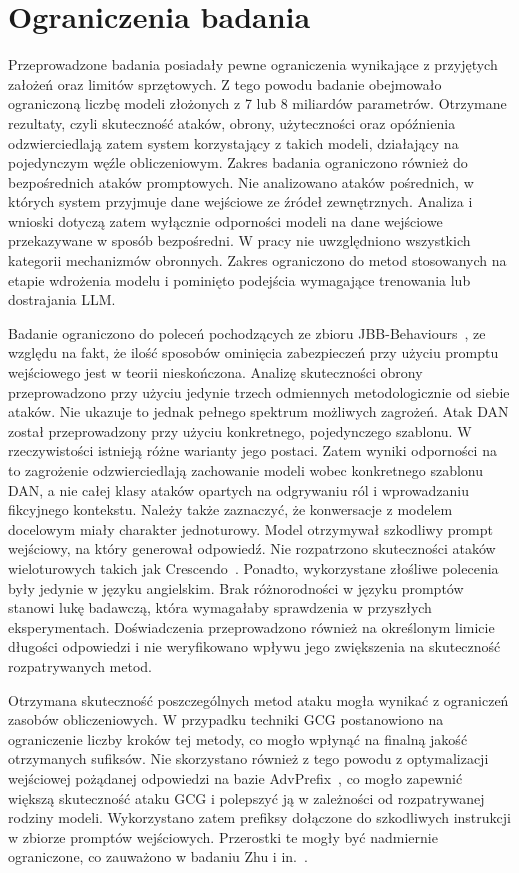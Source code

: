 \section{Ograniczenia badania}
Przeprowadzone badania posiadały pewne ograniczenia wynikające z przyjętych założeń oraz limitów sprzętowych. Z tego powodu badanie obejmowało ograniczoną liczbę modeli złożonych z 7 lub 8 miliardów parametrów. Otrzymane rezultaty, czyli skuteczność ataków, obrony, użyteczności oraz opóźnienia odzwierciedlają zatem system korzystający z takich modeli, działający na pojedynczym węźle obliczeniowym. Zakres badania ograniczono również do bezpośrednich ataków promptowych. Nie analizowano ataków pośrednich, w których system przyjmuje dane wejściowe ze źródeł zewnętrznych. Analiza i wnioski dotyczą zatem wyłącznie odporności modeli na dane wejściowe przekazywane w sposób bezpośredni. W pracy nie uwzględniono wszystkich kategorii mechanizmów obronnych. Zakres ograniczono do metod stosowanych na etapie wdrożenia modelu i pominięto podejścia wymagające trenowania lub dostrajania \gls{LLM}.

Badanie ograniczono do poleceń pochodzących ze zbioru JBB-Behaviours~\cite{chao2024jailbreakbenchopenrobustnessbenchmark}, ze względu na fakt, że ilość sposobów ominięcia zabezpieczeń przy użyciu promptu wejściowego jest w teorii nieskończona. Analizę skuteczności obrony przeprowadzono przy użyciu jedynie trzech odmiennych metodologicznie od siebie ataków. Nie ukazuje to jednak pełnego spektrum możliwych zagrożeń. Atak \gls{DAN} został przeprowadzony przy użyciu konkretnego, pojedynczego szablonu. W rzeczywistości istnieją różne warianty jego postaci. Zatem wyniki odporności na to zagrożenie odzwierciedlają zachowanie modeli wobec konkretnego szablonu \gls{DAN}, a nie całej klasy ataków opartych na odgrywaniu ról i wprowadzaniu fikcyjnego kontekstu. Należy także zaznaczyć, że konwersacje z modelem docelowym miały charakter jednoturowy. Model otrzymywał szkodliwy prompt wejściowy, na który generował odpowiedź. Nie rozpatrzono skuteczności ataków wieloturowych takich jak Crescendo~\cite{russinovich2025greatwritearticlethat}. Ponadto, wykorzystane złośliwe polecenia były jedynie w języku angielskim. Brak różnorodności w języku promptów stanowi lukę badawczą, która wymagałaby sprawdzenia w przyszłych eksperymentach. Doświadczenia przeprowadzono również na określonym limicie długości odpowiedzi i nie weryfikowano wpływu jego zwiększenia na skuteczność rozpatrywanych metod.

Otrzymana skuteczność poszczególnych metod ataku mogła wynikać z ograniczeń zasobów obliczeniowych. W przypadku techniki \gls{GCG} postanowiono na ograniczenie liczby kroków tej metody, co mogło wpłynąć na finalną jakość otrzymanych sufiksów. Nie skorzystano również z tego powodu z optymalizacji wejściowej pożądanej odpowiedzi na bazie AdvPrefix~\cite{zhu2025advprefixobjectivenuancedllm}, co mogło zapewnić większą skuteczność ataku \gls{GCG} i polepszyć ją w zależności od rozpatrywanej rodziny modeli. Wykorzystano zatem prefiksy dołączone do szkodliwych instrukcji w zbiorze promptów wejściowych. Przerostki te mogły być nadmiernie ograniczone, co zauważono w badaniu Zhu i in.~\cite{zhu2025advprefixobjectivenuancedllm}.

